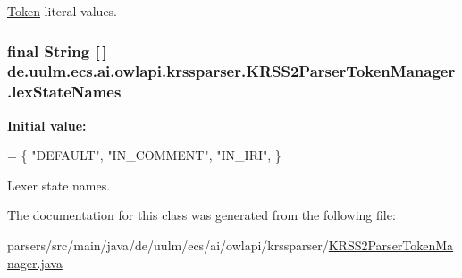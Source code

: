 \hyperlink{classde_1_1uulm_1_1ecs_1_1ai_1_1owlapi_1_1krssparser_1_1_token}{Token} literal values. \hypertarget{classde_1_1uulm_1_1ecs_1_1ai_1_1owlapi_1_1krssparser_1_1_k_r_s_s2_parser_token_manager_aae31017bd32781d9d0ed4c4e814c11f2}{
\subsubsection[{lex\-State\-Names}]{\setlength{\rightskip}{0pt plus 5cm}final String \mbox{[}$\,$\mbox{]} de.\-uulm.\-ecs.\-ai.\-owlapi.\-krssparser.\-K\-R\-S\-S2\-Parser\-Token\-Manager.\-lex\-State\-Names\hspace{0.3cm}{\ttfamily [static]}}}\label{classde_1_1uulm_1_1ecs_1_1ai_1_1owlapi_1_1krssparser_1_1_k_r_s_s2_parser_token_manager_aae31017bd32781d9d0ed4c4e814c11f2}
{\bfseries Initial value\-:}
\begin{DoxyCode}
= \{
        \textcolor{stringliteral}{"DEFAULT"},
        \textcolor{stringliteral}{"IN\_COMMENT"},
        \textcolor{stringliteral}{"IN\_IRI"},
    \}
\end{DoxyCode}
Lexer state names. 

The documentation for this class was generated from the following file\-:\begin{DoxyCompactItemize}
\item 
parsers/src/main/java/de/uulm/ecs/ai/owlapi/krssparser/\hyperlink{_k_r_s_s2_parser_token_manager_8java}{K\-R\-S\-S2\-Parser\-Token\-Manager.\-java}\end{DoxyCompactItemize}
